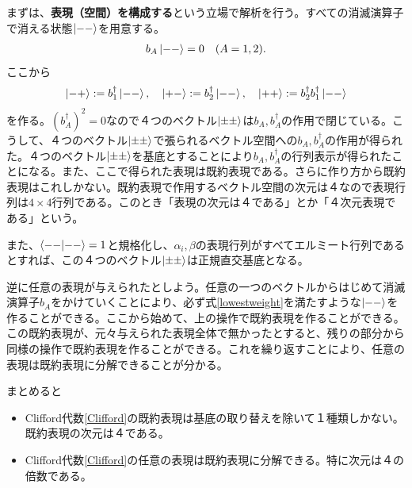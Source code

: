 \documentclass[report,paper=a4, fontsize=12pt, line_length=16cm, number_of_lines=33,dvipdfmx]{jlreq}
\numberwithin{equation}{chapter}
\newcommand{\strong}[1]{{\sffamily \bfseries #1}}
\begin{document}
まずは、\strong{表現（空間）を構成する}という立場で解析を行う。すべての消滅演算子で消える状態$\ket{--}$を用意する。
\begin{align}
  b_A\ket{--}=0\quad (A=1,2).
\end{align}
ここから
\begin{align}
  \ket{-+}:=b_{1}^{\dag}\ket{--},\quad 
  \ket{+-}:=b_{2}^{\dag}\ket{--},\quad 
  \ket{++}:=b_{2}^{\dag}b_{1}^{\dag}\ket{--}
\end{align}
を作る。$(b_A^{\dag})^2=0$なので４つのベクトル$\ket{\pm\pm}$は$b_A,b_A^{\dag}$の作用で閉じている。こうして、４つのベクトル$\ket{\pm\pm}$で張られるベクトル空間への$b_A,b_A^{\dag}$の作用が得られた。４つのベクトル$\ket{\pm\pm}$を基底とすることにより$b_A,b_A^{\dag}$の行列表示が得られたことになる。また、ここで得られた表現は既約表現である。さらに作り方から既約表現はこれしかない。既約表現で作用するベクトル空間の次元は４なので表現行列は$4\times 4$行列である。このとき「表現の次元は４である」とか「４次元表現である」という。

また、$\braket{--}{--}=1$と規格化し、$\alpha_i,\beta$の表現行列がすべてエルミート行列であるとすれば、この４つのベクトル$\ket{\pm\pm}$は正規直交基底となる。

逆に任意の表現が与えられたとしよう。任意の一つのベクトルからはじめて消滅演算子$b_A$をかけていくことにより、必ず式\eqref{lowestweight}を満たすような$\ket{--}$を作ることができる。ここから始めて、上の操作で既約表現を作ることができる。この既約表現が、元々与えられた表現全体で無かったとすると、残りの部分から同様の操作で既約表現を作ることができる。これを繰り返すことにより、任意の表現は既約表現に分解できることが分かる。

まとめると
\begin{itemize}
  \item Clifford代数\eqref{Clifford}の既約表現は基底の取り替えを除いて１種類しかない。既約表現の次元は４である。
  \item Clifford代数\eqref{Clifford}の任意の表現は既約表現に分解できる。特に次元は４の倍数である。
\end{itemize}
\end{document}
